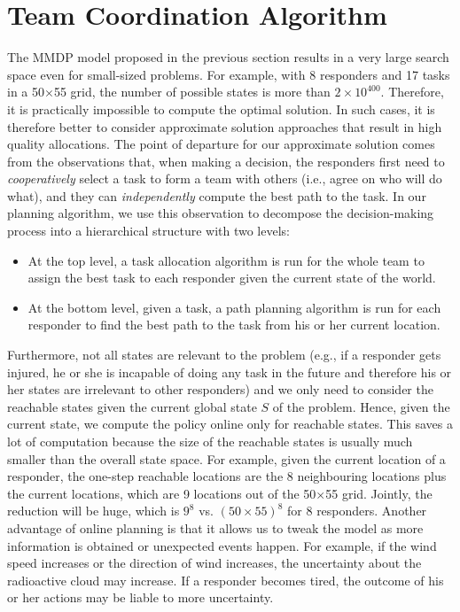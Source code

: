 \section{Team Coordination Algorithm}\label{sec:algo} 
\noindent The  MMDP model proposed in the previous
section results in a very large search space even for small-sized
problems. For example, with 8 responders and 17 tasks in a
50$\times$55 grid, the number of possible states is more than
$2\times 10^{400}$. Therefore, it is practically impossible to
compute the optimal solution. In such cases, it is therefore better
to consider approximate solution approaches that result in high
quality allocations.  The point of departure for our approximate
solution comes from the observations that, when making a decision,
the responders first need to {\em cooperatively} select a task to
form a team with others (i.e., agree on who will do what), and they
can {\em independently} compute the best path to the task. In our
planning algorithm, we use this observation to decompose the
decision-making process into a hierarchical structure with two
levels:
\begin{itemize}
  \itemsep=-2pt
  \item At the top level, a task allocation algorithm is run for
      the whole team to assign the best task to each responder
      given the current state of the world.
  \item At the bottom level, given a task, a path planning
      algorithm is run for each responder to find the best path
      to the task from his or her current location.
\end{itemize}

Furthermore, not all states are relevant to the problem (e.g., if a
responder gets injured, he or she is incapable of doing any task in
the future and therefore his or her states are irrelevant to other
responders) and we only need to consider the reachable states given
the current global state $S$ of the problem. Hence, given the
current state, we compute the policy online only for reachable
states. This saves a lot of computation because the size of the
reachable states is usually much smaller than the overall state
space. For example, given the current location of a responder, the
one-step reachable locations are the 8 neighbouring locations plus
the current locations, which are 9 locations out of the
50$\times$55 grid. Jointly, the reduction will be huge, which is
$9^8$ vs. $(50\times 55)^8$ for 8 responders. Another advantage of
online planning is that it allows us to tweak the model as more
information is obtained or unexpected events happen. For example,
if the wind speed increases or the direction of wind increases, the
uncertainty about the radioactive cloud may increase. If a
responder becomes tired, the outcome of his or her actions may be
liable to more uncertainty.

